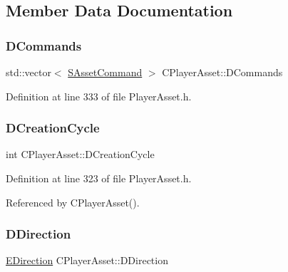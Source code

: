 \subsection{Member Data Documentation}
\hypertarget{classCPlayerAsset_a4d3b96106d3b1c1020f98005884d2a87}{}\label{classCPlayerAsset_a4d3b96106d3b1c1020f98005884d2a87} 
\subsubsection{\texorpdfstring{D\+Commands}{DCommands}}
{\footnotesize\ttfamily std\+::vector$<$ \hyperlink{structSAssetCommand}{S\+Asset\+Command} $>$ C\+Player\+Asset\+::\+D\+Commands\hspace{0.3cm}{\ttfamily [protected]}}



Definition at line 333 of file Player\+Asset.\+h.

\hypertarget{classCPlayerAsset_a8b0efb3ddc27ee11f331ade667bc4b0d}{}\label{classCPlayerAsset_a8b0efb3ddc27ee11f331ade667bc4b0d} 
\subsubsection{\texorpdfstring{D\+Creation\+Cycle}{DCreationCycle}}
{\footnotesize\ttfamily int C\+Player\+Asset\+::\+D\+Creation\+Cycle\hspace{0.3cm}{\ttfamily [protected]}}



Definition at line 323 of file Player\+Asset.\+h.



Referenced by C\+Player\+Asset().

\hypertarget{classCPlayerAsset_a2f07e280268d0402220c583d1029d683}{}\label{classCPlayerAsset_a2f07e280268d0402220c583d1029d683} 
\subsubsection{\texorpdfstring{D\+Direction}{DDirection}}
{\footnotesize\ttfamily \hyperlink{GameDataTypes_8h_acb2b033915f6659a71a38b5aa6e4eb42}{E\+Direction} C\+Player\+Asset\+::\+D\+Direction\hspace{0.3cm}{\ttfamily [protected]}}



